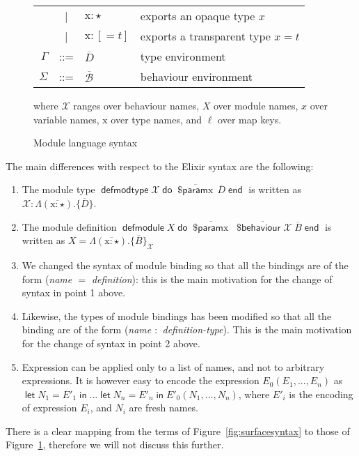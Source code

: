 \documentclass[a4paper,10pt]{article}
\DeclareMathOperator{\kwdefmt}{\textsf{defmodtype}}
\DeclareMathOperator{\kwend}{\textsf{end}}
\DeclareMathOperator{\kwdo}{\textsf{do}}
\DeclareMathOperator{\kwbvr}{\textsf{\$behaviour}}
\DeclareMathOperator{\kwlet}{\textsf{let}}
\DeclareMathOperator{\kwin}{\textsf{in}}
\DeclareMathOperator{\kwprm}{\textsf{\$param}}
\DeclareMathOperator{\kwdefm}{\textsf{defmodule}}
\newcommand{\tx}{\textrm{x}}
\newcommand{\BX}{\ensuremath{\mathcal{X}}}
\begin{document}
\begin{figure}
\begin{tabular}{r c ll}
    & | & $\tx : \star$                                 &\color{Gray} exports an opaque type $x$\\  
    & | & $\tx : [=t]$                                  &\color{Gray} exports a transparent type $x = t$  \\[3mm]
    $\Gamma$ & ::= & $\overline{D}$ &\color{Gray} type environment\\
    $\Sigma$ & ::= & $\overline{\mathcal B}$ &\color{Gray} behaviour environment\\[4mm]
  \end{tabular}

 where $\BX$ ranges over behaviour names, $X$ over module names, $x$ over variable names, $\tx$ over type names, and $\ell$ over map keys. 
  \caption{Module language syntax}\label{fig:modulelangsyntax}
\end{figure}



The main differences with respect to the Elixir syntax are the following:

\begin{enumerate}
  \item The module type $\kwdefmt \BX\kwdo \overline{\kwprm \tx}\, \overline{D} \kwend$ is written as $\BX: \Lambda(\overline{\tx:\star}).\{\overline{D}\}$.
  \item The module definition $\kwdefm X \kwdo \overline{\kwprm \tx}\; \overline{\kwbvr \mathcal{X}}\; \overline{B} \kwend$ is written as $X = \Lambda(\overline{\tx:\star}).\{\overline{B}\}_{\overline{\mathcal{X}}}$
  \item We changed the syntax of module binding so that all the bindings are of the form (\emph{name $=$ definition}): this is the main motivation for the change of syntax in point 1 above.
  \item Likewise, the types of module bindings has been modified so that all the binding are of the form (\emph{name $:$ definition-type}). This is the main motivation for the change of syntax in point 2 above.
  \item Expression can be applied only to a list of names, and not to arbitrary expressions. It is however easy to encode the expression $E_0(E_1,...,E_n)$ as $\kwlet N_1 = E'_1 \kwin ... \kwlet N_n=E'_n\kwin E'_0(N_1,\dots,N_n)$, where $E'_i$ is the encoding of expression $E_i$, and $N_i$ are fresh names.  
\end{enumerate}
There is a clear mapping from the terms of Figure~\ref{fig:surfacesyntax} to those of Figure~\ref{fig:modulelangsyntax}, therefore we will not discuss this further.
\end{document}
